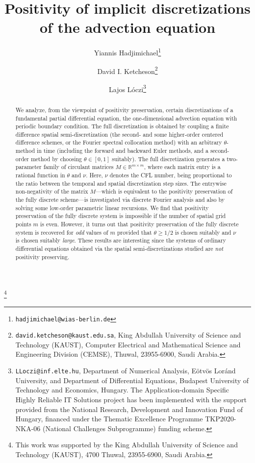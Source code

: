 \documentclass[a4paper]{article}
\title{Positivity of implicit discretizations of the advection equation}
\author{Yiannis Hadjimichael\thanks{\texttt{hadjimichael@wias-berlin.de} }\and David I. Ketcheson\thanks{{\texttt{david.ketcheson@kaust.edu.sa}}, King Abdullah University of Science and Technology (KAUST),
Computer Electrical and Mathematical Science and Engineering Division (CEMSE),
Thuwal, 23955-6900, Saudi Arabia.} \and Lajos L\'oczi\thanks{{\texttt{LLoczi@inf.elte.hu}}, Department of Numerical Analysis, E\"otv\"os Lor\'and University, and Department of Differential Equations, Budapest University of Technology and Economics, Hungary. The Application-domain Specific Highly Reliable IT Solutions project  has been implemented with the support provided from the National Research, Development and Innovation Fund of Hungary, financed under the Thematic Excellence Programme TKP2020-NKA-06 (National Challenges Subprogramme) funding scheme.}}
\newcommand{\te}{\theta}
\newcommand\blfootnote[1]{%
  \begingroup
  \renewcommand\thefootnote{}\footnote{#1}%
  \addtocounter{footnote}{-1}%
  \endgroup
}
\begin{document}
\maketitle
\begin{abstract}
We analyze, from the viewpoint of positivity
preservation, certain discretizations of a fundamental partial differential
equation, the one-dimensional advection equation with periodic boundary
condition. The full discretization is obtained by coupling a finite difference spatial semi-discretization 
(the second- and some higher-order centered difference schemes, or the Fourier spectral collocation method)
with an arbitrary $\te$-method in time
(including the forward and backward Euler methods, and a second-order method by
choosing $\te\in [0,1]$ suitably). 
The full discretization generates a
two-parameter family of circulant matrices $M\in\mathbb{R}^{m\times m}$, 
where each matrix entry is a
rational function in $\te$ and $\nu$. Here, $\nu$ denotes the CFL number,
being proportional to the ratio between the temporal and spatial discretization
step sizes. The entrywise non-negativity of the matrix $M$---which is
equivalent to the positivity preservation of the fully discrete
scheme---is investigated via discrete Fourier analysis and also by solving some low-order parametric 
linear recursions. We find that positivity preservation of the fully discrete system is impossible if the number  of spatial grid points $m$ is even. However, it turns out that positivity preservation of the fully discrete system is recovered for \emph{odd} values of $m$
provided that $\te\ge 1/2$ is chosen suitably and $\nu$ is chosen suitably \emph{large}. 
These results are interesting since the systems of ordinary differential equations obtained via the spatial semi-discretizations studied are \emph{not} positivity preserving. 
\end{abstract}
\blfootnote{This work was supported by the King Abdullah University of Science and Technology (KAUST), 4700
Thuwal, 23955-6900, Saudi Arabia.}
\end{document}
